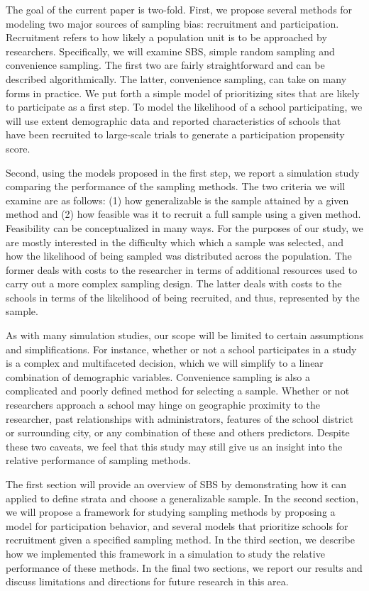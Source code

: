 \documentclass[
  english,
  man,floatsintext]{apa6}
\begin{document}
The goal of the current paper is two-fold. First, we propose several methods for modeling two major sources of sampling bias: recruitment and participation. Recruitment refers to how likely a population unit is to be approached by researchers. Specifically, we will examine SBS, simple random sampling and convenience sampling. The first two are fairly straightforward and can be described algorithmically. The latter, convenience sampling, can take on many forms in practice. We put forth a simple model of prioritizing sites that are likely to participate as a first step. To model the likelihood of a school participating, we will use extent demographic data and reported characteristics of schools that have been recruited to large-scale trials to generate a participation propensity score.

Second, using the models proposed in the first step, we report a simulation study comparing the performance of the sampling methods. The two criteria we will examine are as follows: (1) how generalizable is the sample attained by a given method and (2) how feasible was it to recruit a full sample using a given method. Feasibility can be conceptualized in many ways. For the purposes of our study, we are mostly interested in the difficulty which which a sample was selected, and how the likelihood of being sampled was distributed across the population. The former deals with costs to the researcher in terms of additional resources used to carry out a more complex sampling design. The latter deals with costs to the schools in terms of the likelihood of being recruited, and thus, represented by the sample.

As with many simulation studies, our scope will be limited to certain assumptions and simplifications. For instance, whether or not a school participates in a study is a complex and multifaceted decision, which we will simplify to a linear combination of demographic variables. Convenience sampling is also a complicated and poorly defined method for selecting a sample. Whether or not researchers approach a school may hinge on geographic proximity to the researcher, past relationships with administrators, features of the school district or surrounding city, or any combination of these and others predictors. Despite these two caveats, we feel that this study may still give us an insight into the relative performance of sampling methods.

The first section will provide an overview of SBS by demonstrating how it can applied to define strata and choose a generalizable sample. In the second section, we will propose a framework for studying sampling methods by proposing a model for participation behavior, and several models that prioritize schools for recruitment given a specified sampling method. In the third section, we describe how we implemented this framework in a simulation to study the relative performance of these methods. In the final two sections, we report our results and discuss limitations and directions for future research in this area.
\end{document}
